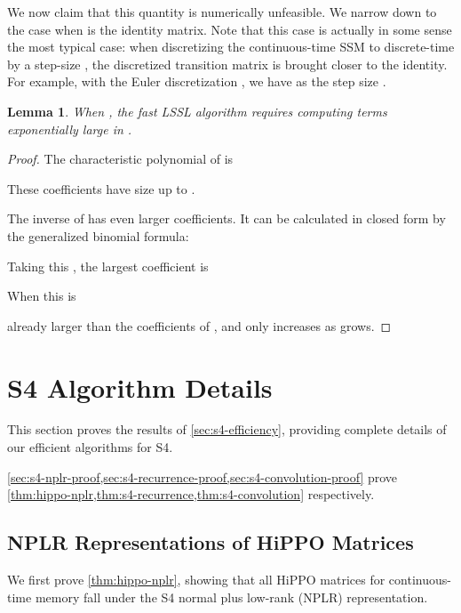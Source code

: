 \documentclass{article}
\newtheorem{lemma}{Lemma}[section]
\newcommand{\methodabbrv}{S4}
\begin{document}
We now claim that this quantity is numerically unfeasible.
We narrow down to the case when  is the identity matrix.
Note that this case is actually in some sense the most typical case:
when discretizing the continuous-time SSM to discrete-time by a step-size ,
the discretized transition matrix  is brought closer to the identity.
For example, with the Euler discretization ,
we have  as the step size .

\begin{lemma}When , the fast LSSL algorithm requires computing terms exponentially large in .
\end{lemma}
\begin{proof}The characteristic polynomial of  is
  
  These coefficients have size up to .

  The inverse of  has even larger coefficients.
  It can be calculated in closed form by the generalized binomial formula:
  
  Taking this , the largest coefficient is
  
  When  this is
  
  already larger than the coefficients of , and only increases as  grows.
\end{proof}

\section{\methodabbrv{} Algorithm Details}
\label{sec:s4-details}

This section proves the results of \cref{sec:s4-efficiency}, providing complete details of our efficient algorithms for \methodabbrv{}.

\cref{sec:s4-nplr-proof,sec:s4-recurrence-proof,sec:s4-convolution-proof}
prove \cref{thm:hippo-nplr,thm:s4-recurrence,thm:s4-convolution}
respectively.

\subsection{NPLR Representations of HiPPO Matrices}
\label{sec:s4-nplr-proof}

We first prove \cref{thm:hippo-nplr},
showing that all HiPPO matrices for continuous-time memory fall under the \methodabbrv{} normal plus low-rank (NPLR) representation.
\end{document}
